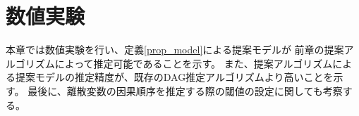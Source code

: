 
\section{数値実験}
\label{part:experience}

本章では数値実験を行い、定義\ref{prop_model}による提案モデルが
前章の提案アルゴリズムによって推定可能であることを示す。
また、提案アルゴリズムによる提案モデルの推定精度が、既存のDAG推定アルゴリズムより高いことを示す。
最後に、離散変数の因果順序を推定する際の閾値の設定に関しても考察する。
%

%

%
\pagebreak[4]

